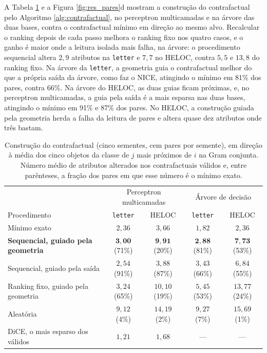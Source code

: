 A Tabela \ref{tab:res_contrafactual} e a Figura \ref{fig:res_pares}d mostram a construção do contrafactual pelo Algoritmo \ref{alg:contrafactual}, no perceptron multicamadas e na árvore das duas bases, contra o contrafactual mínimo em direção ao mesmo alvo. Recalcular o ranking depois de cada passo melhora o ranking fixo nos quatro casos, e o ganho é maior onde a leitura isolada mais falha, na árvore: o procedimento sequencial altera $2{,}9$ atributos na \texttt{letter} e $7{,}7$ no HELOC, contra $5{,}5$ e $13{,}8$ do ranking fixo. Na árvore da \texttt{letter}, a geometria guia o contrafactual melhor do que a própria saída da árvore, como faz o NICE, atingindo o mínimo em 81\% dos pares, contra 66\%. Na árvore do HELOC, as duas guias ficam próximas, e, no perceptron multicamadas, a guia pela saída é a mais esparsa nas duas bases, atingindo o mínimo em 91\% e 87\% dos pares. No HELOC, a construção guiada pela geometria herda a falha da leitura de pares e altera quase dez atributos onde três bastam.

\begin{table}[pos=htbp]
\centering
\caption{Construção do contrafactual (cinco sementes, cem pares por semente), em direção à média dos cinco objetos da classe de $j$ mais próximos de $i$ na Gram conjunta. Número médio de atributos alterados nos contrafactuais válidos e, entre parênteses, a fração dos pares em que esse número é o mínimo exato.}
\label{tab:res_contrafactual}
\footnotesize
\setlength{\tabcolsep}{3pt}
\begin{tabular}{l c c c c}
\hline
 & \multicolumn{2}{c}{Perceptron multicamadas} & \multicolumn{2}{c}{Árvore de decisão} \\
Procedimento & \texttt{letter} & HELOC & \texttt{letter} & HELOC \\
\hline
Mínimo exato & $2{,}36$ & $3{,}66$ & $1{,}82$ & $2{,}36$ \\
\textbf{Sequencial, guiado pela geometria} & $\mathbf{3{,}00}$ (71\%) & $\mathbf{9{,}91}$ (20\%) & $\mathbf{2{,}88}$ (81\%) & $\mathbf{7{,}73}$ (53\%) \\
Sequencial, guiado pela saída & $2{,}54$ (91\%) & $3{,}88$ (87\%) & $3{,}43$ (66\%) & $6{,}84$ (55\%) \\
Ranking fixo, guiado pela geometria & $3{,}24$ (65\%) & $10{,}10$ (19\%) & $5{,}45$ (53\%) & $13{,}77$ (24\%) \\
Aleatória & $9{,}12$ (4\%) & $14{,}19$ (2\%) & $9{,}27$ (7\%) & $15{,}69$ (1\%) \\
DiCE, o mais esparso dos válidos & $1{,}21$ & $1{,}68$ & --- & --- \\
\hline
\end{tabular}
\end{table}


